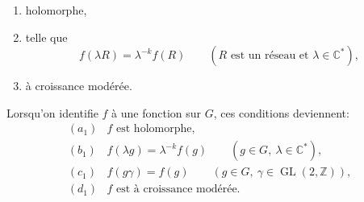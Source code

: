 \documentclass[10pt,a4paper]{article}
\providecommand{\GL}{\operatorname{GL}}
\providecommand{\Z}{\mathbb Z}
\providecommand{\C}{\mathbb C}
\begin{document}
\clearpage
{}
\hypertarget{authority-11}{}
{\itshape \begin{enumerate}[label=(\alph*)]
\item holomorphe,
\item telle que
\[
f(\lambda R)=\lambda^{-k}f(R)\qquad(R\text{ est un réseau et }\lambda\in\C^*),
\]
\item[(d)] à croissance modérée.
\end{enumerate}
\par}
Lorsqu'on identifie \(f\) à une fonction sur \(G\), ces conditions deviennent:
\[
\begin{array}{ll}
(a_1)& f\text{ est holomorphe},\\[0.25em]
(b_1)& f(\lambda g)=\lambda^{-k}f(g)\qquad(g\in G,\ \lambda\in\C^*),\\[0.25em]
(c_1)& f(g\gamma)=f(g)\qquad(g\in G,\ \gamma\in\GL(2,\Z)),\\[0.25em]
(d_1)& f\text{ est à croissance modérée.}
\end{array}
\]
\end{document}
